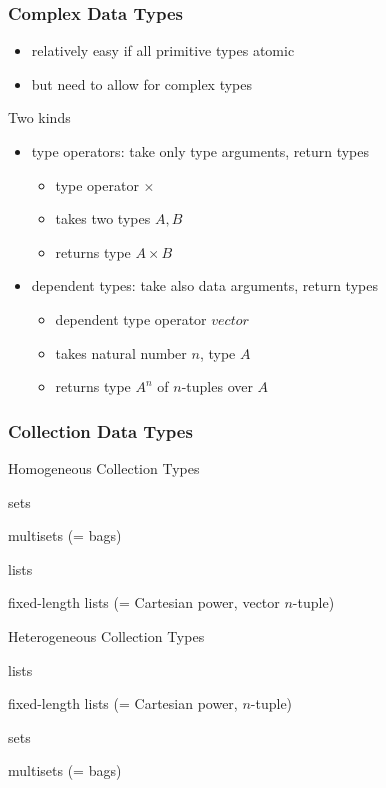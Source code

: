 \documentclass{beamer}
\renewcommand{\emph}[1]{\alert{#1}}
\begin{document}
\begin{frame}\frametitle{Complex Data Types}
\begin{itemize}
 \item relatively easy if all primitive types atomic
 \item but need to allow for complex types
\end{itemize}

Two kinds
\begin{itemize}
\item type operators: take \emph{only type arguments}, return types
 \begin{itemize}
 \item type operator $\times$
 \item takes two types $A,B$
 \item returns type $A\times B$
 \end{itemize}
\item dependent types: take \emph{also data arguments}, return types
 \begin{itemize}
 \item dependent type operator $vector$
 \item takes natural number $n$, type $A$
 \item returns type $A^n$ of $n$-tuples over $A$
 \end{itemize}
\end{itemize}
\end{frame}

\begin{frame}\frametitle{Collection Data Types}
\begin{blockitems}{Homogeneous Collection Types}
 \item sets
 \item multisets (= bags)
 \item lists
 \item fixed-length lists (= Cartesian power, vector $n$-tuple)
\end{blockitems}

\begin{blockitems}{Heterogeneous Collection Types}
 \item lists
 \item fixed-length lists (= Cartesian power, $n$-tuple)
 \item sets
 \item multisets (= bags)
\end{blockitems}
\end{frame}
\end{document}
